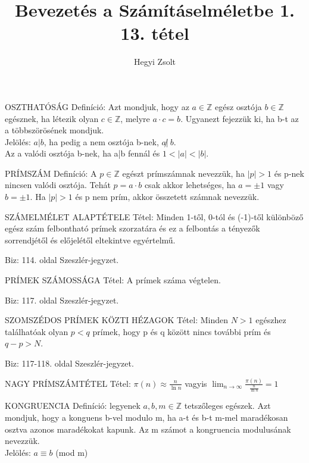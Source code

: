 \documentclass[]{article}
\title{Bevezetés a Számításelméletbe 1.\\{\large 13. tétel}}
\author{Hegyi Zsolt}
\begin{document}
\maketitle{}
\begin{shaded}
OSZTHATÓSÁG Definíció: Azt mondjuk, hogy az $a \in \mathbb{Z}$ egész osztója $b \in \mathbb{Z}$ egésznek, ha létezik olyan $c \in \mathbb{Z}$, melyre $a \cdot c = b$. Ugyanezt fejezzük ki, ha b-t az a többszörösének mondjuk. \\
Jelölés: $a|b$, ha pedig a nem osztója b-nek, $a\!\not|\ b$.\\Az a valódi osztója b-nek, ha a|b fennál és $1 < |a| < |b|$.
\end{shaded}
\begin{shaded}
PRÍMSZÁM Definíció: A $p \in \mathbb{Z}$ egészt prímszámnak nevezzük, ha $|p| > 1$ és p-nek nincsen valódi osztója. Tehát $p = a \cdot b$ csak akkor lehetséges, ha $a = \pm 1$ vagy $b = \pm 1$. Ha $|p| > 1$ és p nem prím, akkor összetett számnak nevezzük.
\end{shaded}
\begin{framed}
SZÁMELMÉLET ALAPTÉTELE Tétel: Minden 1-től, 0-tól és (-1)-től különböző egész szám felbontható prímek szorzatára és ez a felbontás a tényezők sorrendjétől és előjelétől eltekintve egyértelmű.
\end{framed}
\begin{leftbar}
Biz: 114. oldal Szeszlér-jegyzet.
\end{leftbar}
\begin{framed}
PRÍMEK SZÁMOSSÁGA Tétel: A prímek száma végtelen.
\end{framed}
\begin{leftbar}
Biz: 117. oldal Szeszlér-jegyzet.
\end{leftbar}
\begin{framed}
SZOMSZÉDOS PRÍMEK KÖZTI HÉZAGOK Tétel: Minden $N > 1$ egészhez találhatóak olyan $p < q$ prímek, hogy p és q között nincs további prím és $q-p>N$.
\end{framed}
\begin{leftbar}
Biz: 117-118. oldal Szeszlér-jegyzet.
\end{leftbar}
\begin{framed}
NAGY PRÍMSZÁMTÉTEL Tétel: $\pi(n) \approx \frac{n}{\ln{n}}$ vagyis $\lim_{n\to\infty} \frac{\pi(n)}{\frac{n}{\ln{n}}} = 1$
\end{framed}
\begin{shaded}
KONGRUENCIA Definíció: legyenek $a,b,m\in\mathbb{Z}$ tetszőleges egészek. Azt mondjuk, hogy a konguens b-vel modulo m, ha a-t és b-t m-mel maradékosan osztva azonos maradékokat kapunk. Az m számot a kongruencia modulusának nevezzük. \\
Jelölés: $a \equiv b$ (mod m)

\end{shaded}
\end{document}
